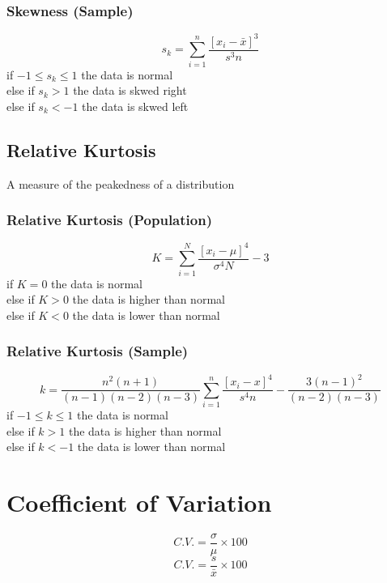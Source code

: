 \documentclass[twocolumn]{article}
\begin{document}
\subsubsection{Skewness (Sample)}
\begin{equation}
    s_{k} = \sum_{i=1}^{n}\frac{[x_{i} - \bar{x}]^{3}}{s^{3}n}
\end{equation}
if $-1 \leq s_{k} \leq 1$ the data is normal\\
else if $s_{k} > 1$ the data is skwed right\\
else if $s_{k} < -1$ the data is skwed left
\subsection{Relative Kurtosis}
A measure of the peakedness of a distribution
\subsubsection{Relative Kurtosis (Population)}
\begin{equation}
    K = \sum_{i=1}^{N}\frac{[x_{i} - \mu]^{4}}{\sigma^{4}N} - 3
\end{equation}
if $K = 0$ the data is normal\\
else if $K > 0$ the data is higher than normal\\
else if $K < 0$ the data is lower than normal
\subsubsection{Relative Kurtosis (Sample)}
\tiny
\begin{equation}
    k = \frac{n^{2}(n+1)}{(n-1)(n-2)(n-3)} \sum_{i=1}^{n}\frac{[x_{i}-x]^{4}}{s^{4}n}-\frac{3(n-1)^{2}}{(n-2)(n-3)}
\end{equation}
\normalsize
if $-1 \leq k \leq 1$ the data is normal\\
else if $k > 1$ the data is higher than normal\\
else if $k < -1$ the data is lower than normal
\section{Coefficient of Variation}
\begin{equation}
    C.V. = \frac{\sigma}{\mu} \times 100 %
\end{equation}
\begin{equation}
    C.V. = \frac{s}{\bar{x}} \times 100 %
\end{equation}
\end{document}
